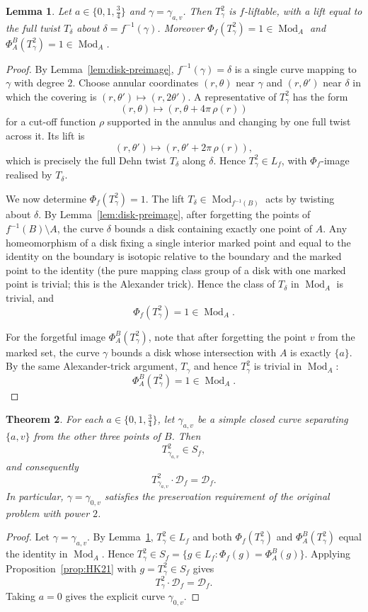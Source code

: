 \documentclass[12pt]{article}
\newtheorem{theorem}{Theorem}[section]
\newtheorem{lemma}[theorem]{Lemma}
\theoremstyle{definition}
\theoremstyle{remark}
\numberwithin{equation}{section}
\newcommand{\Mod}{\operatorname{Mod}}
\newcommand{\Df}{\mathcal D_f}
\newcommand{\Lf}{L_f}
\newcommand{\Sf}{S_f}
\newcommand{\HF}{\Phi_f}
\newcommand{\FAB}{\Phi_A^B}
\begin{document}
\begin{lemma}
\label{lem:lift-square}
Let $a\in\{0,1,\tfrac34\}$ and $\gamma=\gamma_{a,v}$.  Then
$T_{\gamma}^{2}$ is $f$-liftable, with a lift equal to the full twist
$T_{\delta}$ about $\delta=f^{-1}(\gamma)$.  Moreover
$\HF(T_{\gamma}^{2})=1\in\Mod_{A}$ and
$\FAB(T_{\gamma}^{2})=1\in\Mod_{A}$.
\end{lemma}
\begin{proof}
By Lemma~\ref{lem:disk-preimage}, $f^{-1}(\gamma)=\delta$ is a single
curve mapping to $\gamma$ with degree $2$.  Choose annular coordinates
$(r,\theta)$ near $\gamma$ and $(r,\theta')$ near $\delta$ in which the
covering is $(r,\theta')\mapsto(r,2\theta')$.  A representative of
$T_{\gamma}^{2}$ has the form
\[
(r,\theta)\longmapsto(r,\theta+4\pi\,\rho(r))
\]
for a cut-off function $\rho$ supported in the annulus and changing by
one full twist across it.  Its lift is
\[
(r,\theta')\longmapsto(r,\theta'+2\pi\,\rho(r)),
\]
which is precisely the full Dehn twist $T_{\delta}$ along $\delta$.
Hence $T_{\gamma}^{2}\in\Lf$, with $\HF$-image realised by $T_{\delta}$.

We now determine $\HF(T_{\gamma}^{2})=1$.  The lift
$T_{\delta}\in\Mod_{f^{-1}(B)}$ acts by twisting about $\delta$.  By
Lemma~\ref{lem:disk-preimage}, after forgetting the points of
$f^{-1}(B)\setminus A$, the curve $\delta$ bounds a disk containing
exactly one point of $A$.  Any homeomorphism of a disk fixing a single
interior marked point and equal to the identity on the boundary is
isotopic relative to the boundary and the marked point to the identity
(the pure mapping class group of a disk with one marked point is
trivial; this is the Alexander trick).  Hence the class of $T_{\delta}$
in $\Mod_{A}$ is trivial, and
\[
\HF(T_{\gamma}^{2})=1\in\Mod_{A}.
\]

For the forgetful image $\FAB(T_{\gamma}^{2})$, note that after
forgetting the point $v$ from the marked set, the curve $\gamma$
bounds a disk whose intersection with $A$ is exactly $\{a\}$.  By the
same Alexander-trick argument, $T_{\gamma}$ and hence $T_{\gamma}^{2}$
is trivial in $\Mod_{A}$:
\[
\FAB(T_{\gamma}^{2})=1\in\Mod_{A}.
\]
\end{proof}

\begin{theorem}
\label{thm:preservation}
For each $a\in\{0,1,\tfrac34\}$, let $\gamma_{a,v}$ be a simple closed
curve separating $\{a,v\}$ from the other three points of $B$.  Then
\[
T_{\gamma_{a,v}}^{2}\in\Sf,
\]
and consequently
\[
T_{\gamma_{a,v}}^{2}\cdot\Df=\Df.
\]
In particular, $\gamma=\gamma_{0,v}$ satisfies the preservation
requirement of the original problem with power $2$.
\end{theorem}
\begin{proof}
Let $\gamma=\gamma_{a,v}$.  By Lemma~\ref{lem:lift-square},
$T_{\gamma}^{2}\in\Lf$ and both $\HF(T_{\gamma}^{2})$ and
$\FAB(T_{\gamma}^{2})$ equal the identity in $\Mod_{A}$.  Hence
$T_{\gamma}^{2}\in\Sf=\{g\in\Lf:\HF(g)=\FAB(g)\}$.  Applying
Proposition~\ref{prop:HK21} with $g=T_{\gamma}^{2}\in\Sf$ gives
\[
T_{\gamma}^{2}\cdot\Df=\Df.
\]
Taking $a=0$ gives the explicit curve $\gamma_{0,v}$.
\end{proof}
\end{document}
